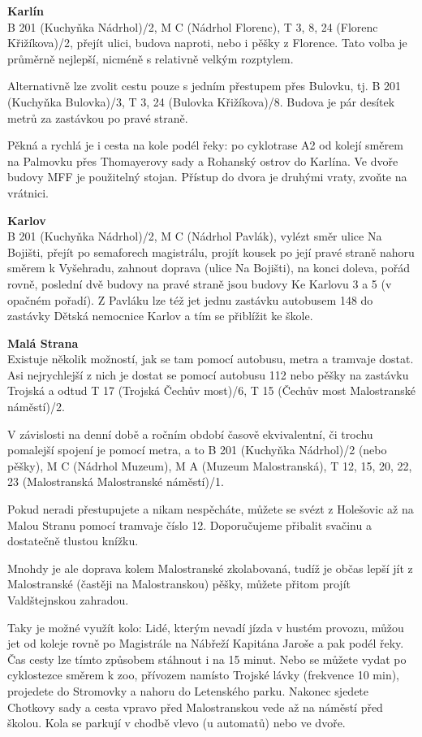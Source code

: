 \textbf{Karlín}\\
B 201 (Kuchyňka \ra Nádrhol)/2, M C (Nádrhol \ra Florenc), T 3, 8, 24 (Florenc
\ra Křižíkova)/2, přejít ulici, budova naproti, nebo i pěšky z Florence. Tato
volba je průměrně nejlepší, nicméně s relativně velkým rozptylem.

Alternativně lze zvolit cestu pouze s jedním přestupem přes Bulovku, tj. B 201
(Kuchyňka \ra Bulovka)/3, T 3, 24 (Bulovka \ra Křižíkova)/8. Budova je pár
desítek metrů za zastávkou po pravé straně.

Pěkná a rychlá je i cesta na kole podél řeky: po cyklotrase A2 od kolejí směrem
na Palmovku přes Thomayerovy sady a Rohanský ostrov do Karlína. Ve dvoře budovy
MFF je použitelný stojan. Přístup do dvora je druhými vraty, zvoňte na vrátnici.

\textbf{Karlov} \\
B 201 (Kuchyňka \ra Nádrhol)/2, M C (Nádrhol \ra Pavlák), vylézt směr ulice Na
Bojišti, přejít po semaforech magistrálu, projít kousek po její pravé straně
nahoru směrem k Vyšehradu, zahnout doprava (ulice Na Bojišti), na konci doleva,
pořád rovně, poslední dvě budovy na pravé straně jsou budovy Ke Karlovu 3 a 5 (v
opačném pořadí). Z Pavláku lze též jet jednu zastávku autobusem 148 do zastávky
Dětská nemocnice Karlov a tím se přiblížit ke škole.

\textbf{Malá Strana}\\
Existuje několik možností, jak se tam pomocí autobusu, metra a tramvaje dostat.
Asi nejrychlejší z nich je dostat se pomocí autobusu 112 nebo pěšky na zastávku
Trojská a odtud T 17 (Trojská \ra Čechův most)/6, T 15 (Čechův most \ra
Malostranské náměstí)/2.

V závislosti na denní době a ročním období časově ekvivalentní, či trochu
pomalejší spojení je pomocí metra, a to B 201 (Kuchyňka \ra Nádrhol)/2 (nebo
pěšky), M C (Nádrhol \ra Muzeum), M A (Muzeum \ra Malostranská), T 12, 15, 20,
22, 23 (Malostranská \ra Malostranské náměstí)/1.

Pokud neradi přestupujete a nikam nespěcháte, můžete se svézt z Holešovic až na
Malou Stranu pomocí tramvaje číslo 12. Doporučujeme přibalit svačinu a
dostatečně tlustou knížku.

Mnohdy je ale doprava kolem Malostranské zkolabovaná, tudíž je občas lepší jít z
Malostranské (častěji na Malostranskou) pěšky, můžete přitom projít
Valdštejnskou zahradou.

Taky je možné využít kolo: 
Lidé, kterým nevadí jízda v hustém provozu, můžou jet od koleje rovně po Magistrále na
Nábřeží Kapitána Jaroše a pak podél řeky. Čas cesty lze tímto způsobem
stáhnout i na 15 minut.
Nebo se můžete vydat po cyklostezce směrem k zoo, přívozem namísto Trojské lávky (frekvence 10 min),
projedete do Stromovky a nahoru do Letenského parku. Nakonec sjedete
Chotkovy sady a cesta vpravo před Malostranskou vede až na náměstí před školou.
Kola se parkují v chodbě vlevo (u automatů) nebo ve dvoře.

